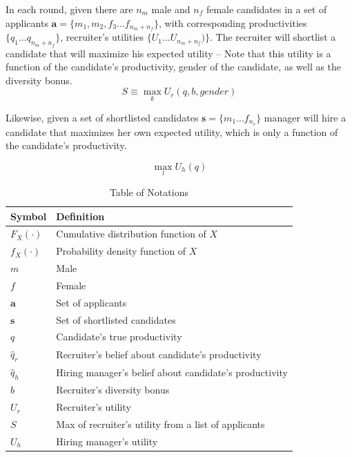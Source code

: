 \documentclass[11pt]{article}
\begin{document}
In each round, given there are $n_m$ male and $n_f$ female candidates in a set of applicants $\bm{a}=\{m_1, m_2, f_3...f_{n_m+n_f}\}$, with corresponding productivities $\{q_1...q_{n_m+n_f}\}$, recruiter's utilities $\{U_1...U_{n_m+n_f})\}$. The recruiter will shortlist a candidate that will maximize his expected utility -- Note that this utility is a function of the candidate's productivity, gender of the candidate, as well as the diversity bonus.
$$S \equiv \max_k U_r(q, b, \textit{gender})$$

Likewise, given a set of shortlisted candidates $\bm{s}=\{m_1...f_{n_s}\}$ manager will hire a candidate that maximizes her own expected utility, which is only a function of the candidate's productivity.

$$\max_l U_h(q)$$

\begin{table}
    \caption{Table of Notations}
    \begin{center}

        \begin{tabular}{ l l}
            \hline
            Symbol       & Definition                                             \\
            \hline
            $F_X(\cdot)$ & Cumulative distribution function of $X$                \\
            $f_X(\cdot)$ & Probability density function of $X$                    \\
            $m$          & Male                                                   \\
            $f$          & Female                                                 \\
            $\bm{a}$     & Set of applicants                                      \\
            $\bm{s}$     & Set of shortlisted candidates                          \\
            $q$          & Candidate's true productivity                          \\
            $\hat{q}_r$  & Recruiter's belief about candidate's productivity      \\
            $\hat{q}_h$  & Hiring manager's belief about candidate's productivity \\
            $b$          & Recruiter's diversity bonus                            \\
            $U_r$        & Recruiter's utility                                    \\
            $S$          & Max of recruiter's utility from a list of applicants   \\
            $U_h$        & Hiring manager's utility                               \\
        \end{tabular}
    \end{center}


\end{table}
\end{document}
